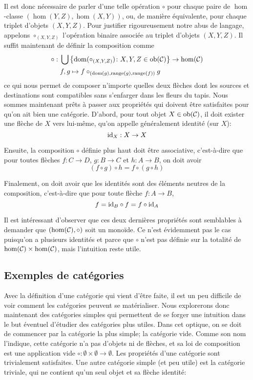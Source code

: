 Il est donc nécessaire de parler d'une telle opération $\circ$ pour chaque
paire de $\hom$-classe $\left(\hom(Y, Z), \hom(X, Y)\right)$, ou, de manière
équivalente, pour chaque triplet d'objets $\left(X, Y, Z\right)$. Pour justifier
rigoureusement notre abus de langage, appelons $\circ_{\left(X,Y,Z\right)}$
l'opération binaire associée au triplet d'objets $\left(X,Y,Z\right)$.
Il suffit maintenant de définir la composition comme
\begin{align*}
    \circ : \; &\bigcup \left\{ \mathrm{dom}(\circ_{\left(X,Y,Z\right)})
                            \colon X, Y, Z \in \mathrm{ob}(\mathcal{C}) \right\} \to \hom(\mathcal{C}) \\
           & f, g \mapsto f \circ_{\left(\mathrm{dom}(g), \mathrm{range}(g), \mathrm{range}(f)\right)} g
\end{align*}
ce qui nous permet de composer n'importe quelles deux flèches dont les sources
et destinations sont compatibles sans s'enfarger dans les fleurs du tapis. Nous
sommes maintenant prêts à passer aux propriétés qui doivent être satisfaites
pour qu'on ait bien une catégorie. D'abord, pour tout objet $X \in \mathrm{ob}(\mathcal{C})$,
il doit exister une flèche de $X$ vers lui-même, qu'on appelle généralement
identité (sur $X$):
\[
    \mathrm{id}_X : X \to X
\]

Ensuite, la composition $\circ$ définie plus haut doit être associative,
c'est-à-dire que pour toutes flèches $f : C \to D$, $g : B \to C$ et
$h : A \to B$, on doit avoir
\[
    (f \circ g) \circ h = f \circ (g \circ h)
\]

Finalement, on doit avoir que les identités sont des éléments neutres de la
composition, c'est-à-dire que pour toute flèche $f : A \to B$,
\[
    f = \mathrm{id}_B \circ f = f \circ \mathrm{id}_A
\]

Il est intéressant d'observer que ces deux dernières propriétés sont
semblables à demander que $\left(\hom(\mathcal{C}), \circ\right)$ soit un monoïde.
Ce n'est évidemment pas le cas puisqu'on a plusieurs identités et parce
que $\circ$ n'est pas définie sur la totalité de $\hom(\mathcal{C}) \times \hom(\mathcal{C})$,
mais l'intuition reste utile.


\subsection{Exemples de catégories}
Avec la définition d'une catégorie qui vient d'être faite, il est un peu
difficile de voir comment les catégories peuvent se matérialiser. Nous
explorerons donc maintenant des catégories simples qui permettent de se
forger une intuition dans le but éventuel d'étudier des catégories plus utiles.
Dans cet optique, on se doit de commencer par la catégorie la plus simple;
la catégorie vide. Comme son nom l'indique, cette catégorie n'a pas d'objets
ni de flèches, et sa loi de composition est une application vide
$\circ : \emptyset \times \emptyset \to \emptyset$. Les propriétés d'une
catégorie sont trivialement satisfaites. Une autre catégorie simple (et
peu utile) est la catégorie triviale, qui ne contient qu'un seul objet
et sa flèche identité:

